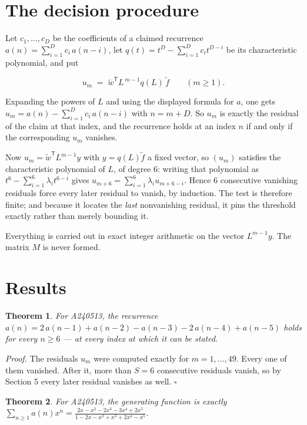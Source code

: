 \documentclass[11pt]{article}
\newtheorem{theorem}{Theorem}
\theoremstyle{definition}
\begin{document}
\section{The decision procedure}

Let $c_1,\dots,c_D$ be the coefficients of a claimed recurrence $a(n) = \sum_{i=1}^{D} c_i\,a(n-i)$, let $q(t) = t^{D} - \sum_{i=1}^{D} c_i t^{D-i}$ be its characteristic polynomial, and put

\[u_m \;=\; \tilde w^{\mathsf T} L^{\,m-1} q(L)\,\tilde f \qquad (m \ge 1).\]

Expanding the powers of $L$ and using the displayed formula for $a$, one gets $u_m = a(n) - \sum_{i=1}^{D} c_i\,a(n-i)$ with $n = m + D$. So $u_m$ is exactly the residual of the claim at that index, and the recurrence holds at an index $n$ if and only if the corresponding $u_m$ vanishes.

Now $u_m = \tilde w^{\mathsf T} L^{m-1} y$ with $y = q(L)\tilde f$ a fixed vector, so $(u_m)$ satisfies the characteristic polynomial of $L$, of degree $6$: writing that polynomial as $t^{6} - \sum_{i=1}^{6} \lambda_i t^{6-i}$ gives $u_{m+6} = \sum_{i=1}^{6} \lambda_i u_{m+6-i}$. Hence $6$ consecutive vanishing residuals force every later residual to vanish, by induction. The test is therefore finite; and because it locates the {\itshape last} nonvanishing residual, it pins the threshold exactly rather than merely bounding it.

Everything is carried out in exact integer arithmetic on the vector $L^{m-1}y$. The matrix $M$ is never formed.

\section{Results}

\begin{theorem} For A240513, the recurrence $a(n) = 2\,a(n-1) + a(n-2) - a(n-3) - 2\,a(n-4) + a(n-5)$ holds for every $n \ge 6$ --- at every index at which it can be stated.\end{theorem}

{\itshape Proof.} The residuals $u_m$ were computed exactly for $m = 1,\dots,49$. Every one of them vanished. After it, more than $S = 6$ consecutive residuals vanish, so by Section 5 every later residual vanishes as well. $\square$

\begin{theorem} For A240513, the generating function is exactly $\sum_{n\ge 1} a(n)x^n = \frac{2x - x^{2} - 2x^{3} - 3x^{4} + 2x^{5}}{1 - 2x - x^{2} + x^{3} + 2x^{4} - x^{5}}$.\end{theorem}
\end{document}
